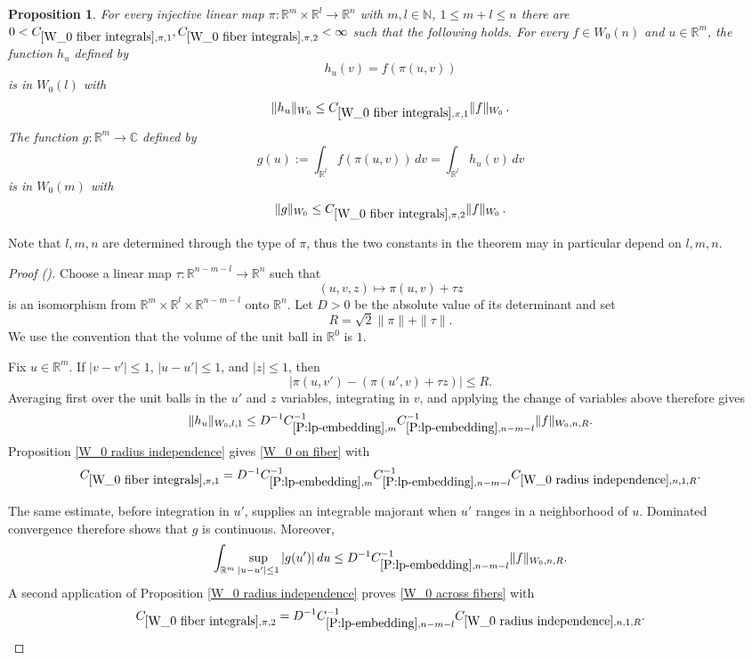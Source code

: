 \documentclass[12pt,reqno]{amsart}
\newcommand{\auto}{{({\tiny\faCar})}}
\theoremstyle{plain}
\newtheorem{proposition}[theorem]{Proposition}
\numberwithin{equation}{section}
\theoremstyle{remark}
\newcommand{\using}[1]{}
\newcommand{\R}{{\mathbb R}}
\newcommand{\Rm}{{\mathbb R}^m}
\newcommand{\N}{{\mathbb N}}
\newcommand{\C}{{\mathbb C}}
\begin{document}
\begin{proposition}\label{W_0 fiber integrals}\using{P:lp-embedding}\using{W_0 radius independence}
For every injective linear map $\pi:\R^{m}\times \R^{l}\to \R^n$ with $m,l\in\N$, $1\le m+l\le n$
there are $0<C_{\ref{W_0 fiber integrals},\pi,1},C_{\ref{W_0 fiber integrals},\pi,2}<\infty$ such that the following holds. For every $f\in W_0(n)$ and $u\in\R^m$, the function $h_u$ defined by
\begin{equation}\label{auto:Wiener-fiber-function}
    h_u(v)=f(\pi(u,v))
\end{equation}
is in $W_0(l)$ with
\begin{equation}\label{W_0 on fiber}
    \|h_u\|_{W_0}\le C_{\ref{W_0 fiber integrals},\pi,1} \|f\|_{W_0}\, .
\end{equation}
The function $g:\Rm\to \C$ defined by
\begin{equation}\label{auto:Wiener-fiber-integral} g(u) := \int_{\R^l} f(\pi(u,v)) \,dv= \int_{\R^l} h_u(v) \,dv \end{equation}
is in $W_0(m)$ with
\begin{equation}\label{W_0 across fibers}
    \|g\|_{W_0}\le C_{\ref{W_0 fiber integrals},\pi,2}  \|f\|_{W_0}\, .
\end{equation}
\end{proposition}
 Note that $l,m,n$ are determined through the type of $\pi$, thus the two constants in the theorem
 may in particular depend on $l,m,n$.

\begin{proof}[Proof \auto]
Choose a linear map $\tau:\R^{n-m-l}\to\R^n$ such that
\[
(u,v,z)\longmapsto \pi(u,v)+\tau z
\]
is an isomorphism from $\R^m\times\R^l\times\R^{n-m-l}$ onto $\R^n$. Let $D>0$ be the absolute value of its determinant and set
\[
R=\sqrt{2}\|\pi\|+\|\tau\|.
\]
We use the convention that the volume of the unit ball in $\R^0$ is $1$.

Fix $u\in\R^m$. If $|v-v'|\le1$, $|u-u'|\le1$, and $|z|\le1$, then
\[
|\pi(u,v')-(\pi(u',v)+\tau z)|\le R.
\]
Averaging first over the unit balls in the $u'$ and $z$ variables, integrating in $v$, and applying the change of variables above therefore gives
\[
\|h_u\|_{W_0,l,1}
\le
D^{-1}C_{\ref{P:lp-embedding},m}^{-1}C_{\ref{P:lp-embedding},n-m-l}^{-1}
\|f\|_{W_0,n,R}.
\]
Proposition \ref{W_0 radius independence} gives \eqref{W_0 on fiber} with
\[
C_{\ref{W_0 fiber integrals},\pi,1}
=
D^{-1}C_{\ref{P:lp-embedding},m}^{-1}C_{\ref{P:lp-embedding},n-m-l}^{-1}
C_{\ref{W_0 radius independence},n,1,R}.
\]

The same estimate, before integration in $u'$, supplies an integrable majorant when $u'$ ranges in a neighborhood of $u$. Dominated convergence therefore shows that $g$ is continuous. Moreover,
\[
\int_{\R^m}\sup_{|u-u'|\le1}|g(u')|\,du
\le
D^{-1}C_{\ref{P:lp-embedding},n-m-l}^{-1}\|f\|_{W_0,n,R}.
\]
A second application of Proposition \ref{W_0 radius independence} proves \eqref{W_0 across fibers} with
\[
C_{\ref{W_0 fiber integrals},\pi,2}
=
D^{-1}C_{\ref{P:lp-embedding},n-m-l}^{-1}
C_{\ref{W_0 radius independence},n,1,R}.
\]
\end{proof}
\end{document}
